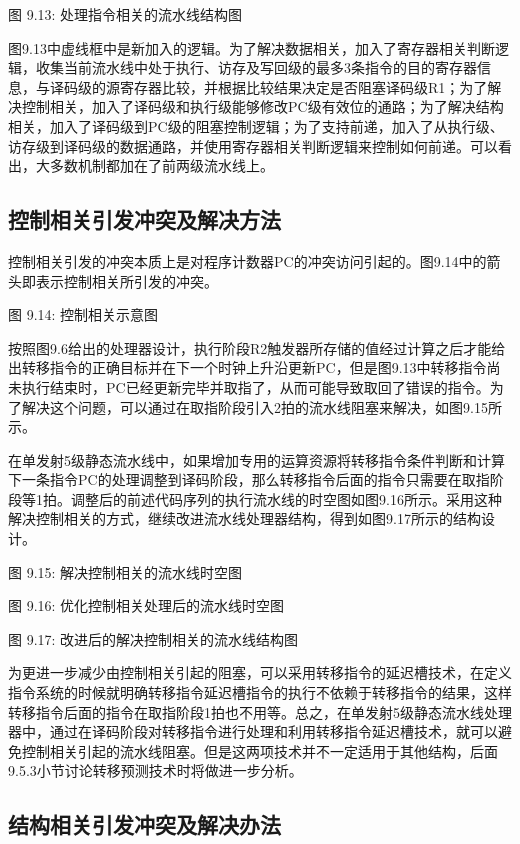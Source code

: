 \documentclass[]{ctexbook}
\begin{document}
图 9.13: 处理指令相关的流水线结构图

图9.13中虚线框中是新加入的逻辑。为了解决数据相关，加入了寄存器相关判断逻辑，收集当前流水线中处于执行、访存及写回级的最多3条指令的目的寄存器信息，与译码级的源寄存器比较，并根据比较结果决定是否阻塞译码级R1；为了解决控制相关，加入了译码级和执行级能够修改PC级有效位的通路；为了解决结构相关，加入了译码级到PC级的阻塞控制逻辑；为了支持前递，加入了从执行级、访存级到译码级的数据通路，并使用寄存器相关判断逻辑来控制如何前递。可以看出，大多数机制都加在了前两级流水线上。

\hypertarget{sec-control-hazard}{%
\subsection{控制相关引发冲突及解决方法}\label{sec-control-hazard}}

控制相关引发的冲突本质上是对程序计数器PC的冲突访问引起的。图9.14中的箭头即表示控制相关所引发的冲突。

图 9.14: 控制相关示意图

按照图9.6给出的处理器设计，执行阶段R2触发器所存储的值经过计算之后才能给出转移指令的正确目标并在下一个时钟上升沿更新PC，但是图9.13中转移指令尚未执行结束时，PC已经更新完毕并取指了，从而可能导致取回了错误的指令。为了解决这个问题，可以通过在取指阶段引入2拍的流水线阻塞来解决，如图9.15所示。

在单发射5级静态流水线中，如果增加专用的运算资源将转移指令条件判断和计算下一条指令PC的处理调整到译码阶段，那么转移指令后面的指令只需要在取指阶段等1拍。调整后的前述代码序列的执行流水线的时空图如图9.16所示。采用这种解决控制相关的方式，继续改进流水线处理器结构，得到如图9.17所示的结构设计。

图 9.15: 解决控制相关的流水线时空图

图 9.16: 优化控制相关处理后的流水线时空图

图 9.17: 改进后的解决控制相关的流水线结构图

为更进一步减少由控制相关引起的阻塞，可以采用转移指令的延迟槽技术，在定义指令系统的时候就明确转移指令延迟槽指令的执行不依赖于转移指令的结果，这样转移指令后面的指令在取指阶段1拍也不用等。总之，在单发射5级静态流水线处理器中，通过在译码阶段对转移指令进行处理和利用转移指令延迟槽技术，就可以避免控制相关引起的流水线阻塞。但是这两项技术并不一定适用于其他结构，后面9.5.3小节讨论转移预测技术时将做进一步分析。

\hypertarget{ux7ed3ux6784ux76f8ux5173ux5f15ux53d1ux51b2ux7a81ux53caux89e3ux51b3ux529eux6cd5}{%
\subsection{结构相关引发冲突及解决办法}\label{ux7ed3ux6784ux76f8ux5173ux5f15ux53d1ux51b2ux7a81ux53caux89e3ux51b3ux529eux6cd5}}
\end{document}
